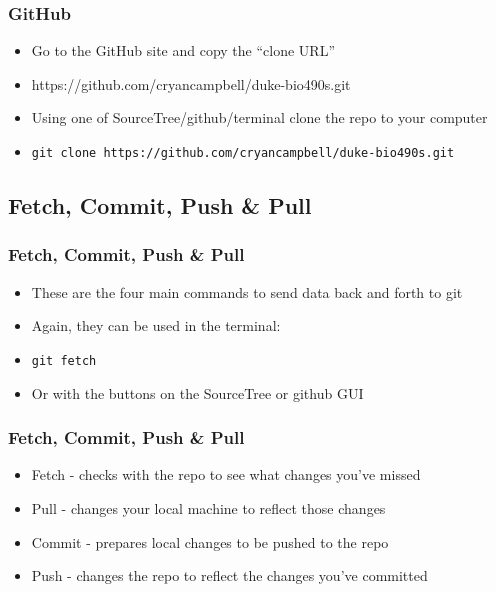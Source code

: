\documentclass[14pt]{beamer}
\begin{document}
\begin{frame}
\frametitle{GitHub}
\begin{itemize}
	\item<+-> Go to the GitHub site and copy the ``clone URL''
	\item<+-> https://github.com/cryancampbell/duke-bio490s.git
	\item<+-> Using one of SourceTree/github/terminal clone the repo to your computer
	\item<+-> \texttt{git clone https://github.com/cryancampbell/duke-bio490s.git}
\end{itemize}
\end{frame}

\subsection{Fetch, Commit, Push \& Pull}

\begin{frame}
\frametitle{Fetch, Commit, Push \& Pull}
\begin{itemize}
	\item<+-> These are the four main commands to send data back and forth to git
	\item<+-> Again, they can be used in the terminal:
	\item<+-> \texttt{git fetch}
	\item<+-> Or with the buttons on the SourceTree or github GUI
\end{itemize}
\end{frame}

\begin{frame}
\frametitle{Fetch, Commit, Push \& Pull}
\begin{itemize}
	\item<+-> Fetch - checks with the repo to see what changes you've missed
	\item<+-> Pull - changes your local machine to reflect those changes
	\item<+-> Commit - prepares local changes to be pushed to the repo
	\item<+-> Push - changes the repo to reflect the changes you've committed
\end{itemize}
\end{frame}
\end{document}
